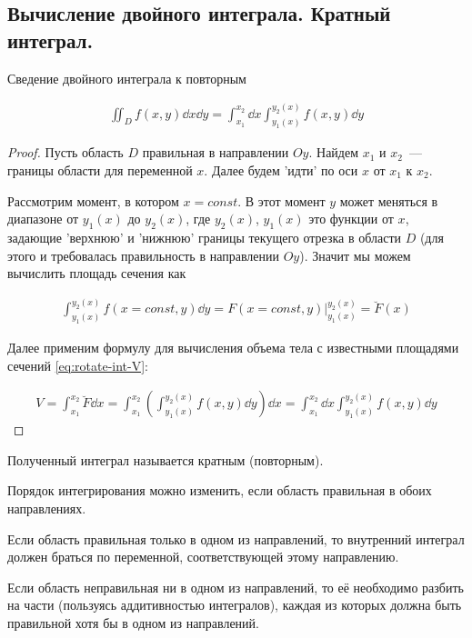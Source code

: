 \subsection{%
  Вычисление двойного интеграла. Кратный интеграл.%
}

\begin{theorem}\label{iint-to-rep}
  Сведение двойного интеграла к повторным

  \begin{align*}
    \iint_{D} f(x, y) \dd x \dd y =
      \int_{x_{1}}^{x_{2}} \dd x \int_{y_{1}(x)}^{y_{2}(x)} f(x, y) \dd y
  \end{align*}
\end{theorem}
\begin{proof}
  Пусть область \(D\) правильная в направлении \(Oy\).
  Найдем \(x_{1}\) и \(x_{2}\)~--- границы области для переменной \(x\).
  Далее будем 'идти' по оси \(x\) от \(x_{1}\) к \(x_{2}\).

  Рассмотрим момент, в котором \(x = const\). В этот момент \(y\) может
  меняться в диапазоне от \(y_{1}(x)\) до \(y_{2}(x)\), где \(y_{2}(x)\),
  \(y_{1}(x)\) это функции от \(x\), задающие 'верхнюю' и 'нижнюю' границы
  текущего отрезка в области \(D\) (для этого и требовалась правильность в
  направлении \(Oy\)). Значит мы можем вычислить площадь сечения как
  
  \begin{align*}
    \int_{y_{1}(x)}^{y_{2}(x)} f(x = const, y) \dd y
    = F(x = const, y) \bigg\vert_{y_{1}(x)}^{y_{2}(x)}
    = \breve{F}(x)
  \end{align*}

  Далее применим формулу для вычисления объема тела с известными площадями
  сечений \eqref{eq:rotate-int-V}:

  \begin{align*}
    V
    = \int_{x_{1}}^{x_{2}} \breve{F} \dd x
    = \int_{x_{1}}^{x_{2}} \left(
      \int_{y_{1}(x)}^{y_{2}(x)} f(x, y) \dd y
    \right) \dd x
    = \int_{x_{1}}^{x_{2}} \dd x \int_{y_{1}(x)}^{y_{2}(x)} f(x, y) \dd y
  \end{align*}
\end{proof}

\begin{remark}
  Полученный интеграл называется кратным (повторным).
\end{remark}

\begin{remark}
  Порядок интегрирования можно изменить, если область правильная в обоих
  направлениях.
  
  Если область правильная только в одном из направлений, то
  внутренний интеграл должен браться по переменной, соответствующей этому
  направлению.

  Если область неправильная ни в одном из направлений, то её необходимо разбить
  на части (пользуясь аддитивностью интегралов), каждая из которых должна быть
  правильной хотя бы в одном из направлений.
\end{remark}
